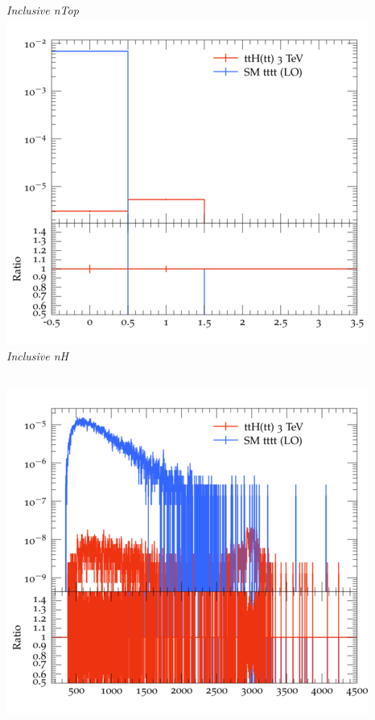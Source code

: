 \documentclass{beamer}
\begin{document}
\begin{frame}
\begin{columns}
\textit{\small Inclusive nTop}
\includegraphics[width=\textwidth]{../plots/ttH_3000/tttt_ttH/Inclusive_nH.png}\\
\textit{\small Inclusive nH}
\end{columns}
\begin{columns}
\includegraphics[width=\textwidth]{../plots/ttH_3000/tttt_ttH/Inclusive_InvM_ttbar12.png}\\

\end{columns}
\end{frame}
\end{document}
